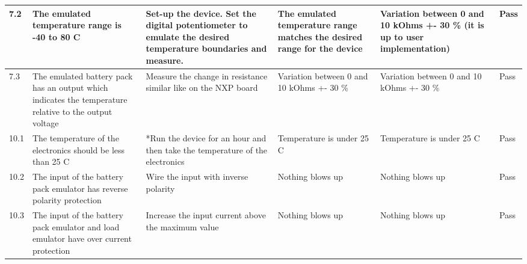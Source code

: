 \begin{table*}[!ht]
\begin{tabular}{|p{0.3cm}|p{3cm}|p{7cm}|p{2.5cm}|p{2cm}|p{1cm}|}
        7.2 & The emulated temperature range is -40 to 80 C & Set-up the device. Set the digital potentiometer to emulate the desired temperature boundaries and measure.  & The emulated temperature range matches the desired range for the device  & Variation between 0 and 10 kOhms +- 30 \% (it is up to user implementation)& Pass \\ \hline
        7.3 & The emulated battery pack has an output which indicates the temperature relative to the output voltage & Measure the change in resistance similar like on the NXP board & Variation between 0 and 10 kOhms +- 30 \% & Variation between 0 and 10 kOhms +- 30 \% & Pass \\ \hline
        10.1 & The temperature of the electronics should be less than 25 C & *Run the device for an hour and then take the temperature of the electronics & Temperature is under 25 C & Temperature is under 25 C & Pass \\ \hline
        10.2 & The input of the battery pack emulator has reverse polarity protection & Wire the input with inverse polarity  & Nothing blows up & Nothing blows up & Pass \\ \hline
        10.3 & The input of the battery pack emulator and load emulator have over current protection & Increase the input current above the maximum value  & Nothing blows up  & Nothing blows up & Pass \\ \hline
    \end{tabular}
    \label{Test Plan}
\end{table*}